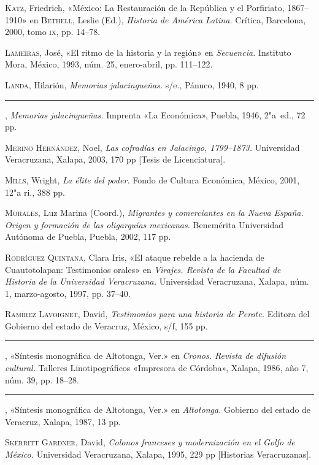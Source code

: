 \documentclass[14pt,twoside,final]{extbook} %
\begin{document}
\textsc{Katz}, Friedrich, «México: La Restauración de la República y el Porfiriato, 1867--1910» en \textsc{Bethell}, Leslie (Ed.), \emph{Historia de América Latina.} Crítica, Barcelona, 2000, tomo \textsc{ix}, pp. 14--78.

\textsc{Lameiras}, José, «El ritmo de la historia y la región» en \textit{Secuencia.} Instituto Mora, México, 1993, núm. 25, enero-abril, pp. 111--122.

\textsc{Landa}, Hilarión, \emph{Memorias jalacingueñas.} s/e., Pánuco, 1940, 8 pp.

\rule{1cm}{0.4pt}, \emph{Memorias jalacingueñas.} Imprenta «La Económica», Puebla, 1946, 2"a~ed., 72 pp.

\textsc{Merino Hernández}, Noel, \emph{Las cofradías en Jalacingo, 1799--1873.} Universidad Veracruzana, Xalapa, 2003, 170 pp [Tesis de Licenciatura].

\textsc{Mills}, Wright, \emph{La élite del poder.} Fondo de Cultura Económica, México, 2001, 12"a ri., 388 pp.

\textsc{Morales}, Luz Marina (Coord.), \emph{Migrantes y comerciantes en la Nueva España. Origen y formación de las oligarquías mexicanas.} Benemérita Universidad Autónoma de Puebla, Puebla, 2002, 117 pp. \enlargethispage{\baselineskip}

\textsc{Rodríguez Quintana}, Clara Iris, «El ataque rebelde a la hacienda de Cuautotolapan: Testimonios orales» en \emph{Virajes. Revista de la Facultad de Historia de la Universidad Veracruzana.} Universidad Veracruzana, Xalapa, núm. 1, marzo-agosto, 1997, pp. 37--40.

\textsc{Ramírez Lavoignet}, David, \emph{Testimonios para una historia de Perote.} Editora del Gobierno del estado de Veracruz, México, s/f, 155 pp.

\rule{1cm}{0.4pt}, «Síntesis monográfica de Altotonga, Ver.» en \emph{Cronos. Revista de difusión cultural.} Talleres Linotipográficos «Impresora de Córdoba», Xalapa, 1986,
año 7, núm. 39, pp. 18--28.

\rule{1cm}{0.4pt}, «Síntesis monográfica de Altotonga, Ver.» en \emph{Altotonga.} Gobierno del estado de Veracruz, Xalapa, 1987, 13 pp.

\textsc{Skerritt Gardner}, David, \emph{Colonos franceses y modernización en el Golfo de México.} Universidad Veracruzana, Xalapa, 1995, 229 pp [Historias Veracruzanas].
\end{document}
